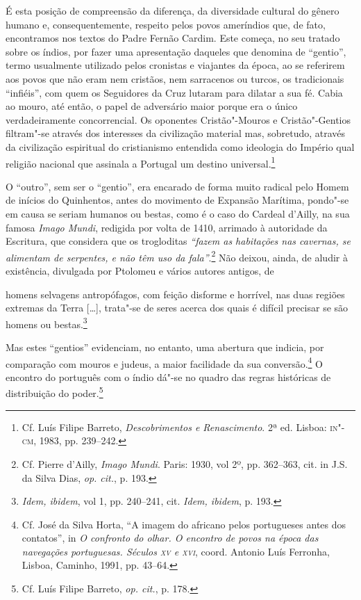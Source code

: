É esta posição de compreensão da diferença, da diversidade cultural
do gênero humano e, consequentemente, respeito pelos povos ameríndios
que, de fato, encontramos nos textos do Padre Fernão Cardim. Este
começa, no seu tratado sobre os índios, por fazer uma
apresentação daqueles que denomina de ``gentio'', termo
usualmente utilizado pelos cronistas e viajantes da época, ao se
referirem aos povos que não eram nem cristãos, nem sarracenos ou
turcos, os tradicionais ``infiéis'', com quem os Seguidores da Cruz
lutaram para dilatar a sua fé. Cabia ao mouro, até então, o papel de
adversário maior porque era o único verdadeiramente concorrencial. Os
oponentes Cristão"-Mouros e Cristão"-Gentios filtram"-se
através dos interesses da civilização material mas, sobretudo, através
da civilização espiritual do cristianismo entendida como ideologia do
Império qual religião nacional que assinala a Portugal um
destino universal.\footnote{ Cf. Luís Filipe Barreto,
\textit{Descobrimentos e Renascimento}. 2ª ed. Lisboa: \textsc{in"-cm}, 1983, pp. 239--242.} 

 O ``outro'', sem ser o ``gentio'', era encarado de forma muito
radical pelo Homem de inícios do Quinhentos, antes do movimento
de Expansão Marítima, pondo"-se em causa se seriam humanos ou bestas,
como é o caso do Cardeal d'Ailly, na sua famosa \textit{Imago Mundi}, 
redigida por volta de 1410, arrimado à autoridade da Escritura, que 
considera que os trogloditas \textit{``fazem as habitações nas cavernas, se
alimentam de serpentes, e não têm uso da fala''}.\footnote{ Cf. Pierre 
d'Ailly, \textit{Imago Mundi}. Paris: 1930, vol 2º, pp. 362--363, cit. in J.S. da Silva Dias,
\textit{op. cit.}, p. 193.} Não deixou, ainda, de aludir à
existência, divulgada por Ptolomeu e vários autores antigos, de

\begin{hedraquote}
[\ldots{}] homens selvagens antropófagos, com feição disforme e horrível,
nas duas regiões extremas da Terra [\ldots{}], trata"-se de seres acerca dos
quais é difícil precisar se são homens ou bestas.\footnote{ \textit{Idem, ibidem}, 
vol 1, pp. 240--241, cit. \textit{Idem, ibidem}, p. 193.} 
\end{hedraquote}

Mas estes ``gentios'' evidenciam, no entanto, uma
abertura que indicia, por comparação com mouros e judeus, a maior
facilidade da sua conversão.\footnote{ Cf. José da Silva Horta, 
``A imagem do africano pelos portugueses antes dos contatos'', in
\textit{O confronto do olhar. O encontro de povos na época das
navegações portuguesas. Séculos \textsc{xv} e \textsc{xvi}}, coord. Antonio Luís Ferronha,
Lisboa, Caminho, 1991, pp. 43--64.} O encontro do português com o índio
dá"-se no quadro das regras históricas de distribuição do 
poder.\footnote{ Cf. Luís Filipe Barreto, \textit{op. cit.}, p. 178.}

